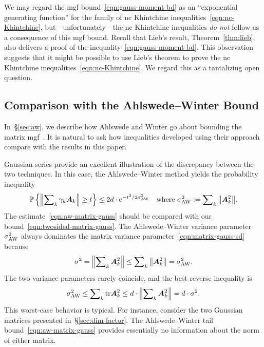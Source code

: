 \documentclass[11pt,letterpaper,twoside,reqno,draft]{amsart}
\theoremstyle{remark}
\numberwithin{equation}{section}
\numberwithin{thm}{section}
\begin{document}
We may regard the mgf bound~\eqref{eqn:gauss-moment-bd} as an ``exponential generating function'' for the family of nc Khintchine inequalities~\eqref{eqn:nc-Khintchine}, but---unfortunately---the nc Khintchine inequalities \emph{do not} follow as a consequence of this mgf bound. 
Recall that Lieb's result, Theorem~\ref{thm:lieb}, also delivers a proof of the inequality~\eqref{eqn:gauss-moment-bd}.  This observation suggests that it might be possible to use Lieb's theorem to prove the nc Khintchine inequalities~\eqref{eqn:nc-Khintchine}.  We regard this as a tantalizing open question.

 

\subsection{Comparison with the Ahlswede--Winter Bound} \label{sec:aw-gauss}

In~\S\ref{sec:aw}, we describe how Ahlswede and Winter go about bounding the matrix mgf~\cite[App.]{AW02:Strong-Converse}.  It is natural to ask how inequalities developed using their approach compare with the results in this paper.

Gaussian series provide an excellent illustration of the discrepancy between the two techniques.  In this case, the Ahlswede--Winter method yields the probability inequality
\begin{equation} \label{eqn:aw-matrix-gauss}
{\mathbb{P}\left\{ {{ {\left\Vert {{ \sum\nolimits_k \gamma_k {\bm{{A}}}_k }} \right\Vert} \geq t }} \right\}}
	\leq 2d \cdot {\mathrm{e}}^{- t^2 / 2\sigma_{\rm AW}^2 }
\quad\text{where $\sigma_{\rm AW}^2 := \sum\nolimits_k {\left\Vert {{{\bm{{A}}}_k^2}} \right\Vert}$.}
\end{equation}
The estimate~\eqref{eqn:aw-matrix-gauss} should be compared with our bound~\eqref{eqn:twosided-matrix-gauss}.
The Ahlswede--Winter variance parameter $\sigma_{\rm AW}^2$
always dominates the matrix variance parameter~\eqref{eqn:matrix-gauss-sd} because
$$
\sigma^2 = {\left\Vert {{ \sum\nolimits_k {\bm{{A}}}_k^2 }} \right\Vert}
	\leq \sum\nolimits_k {\left\Vert {{{\bm{{A}}}_k^2}} \right\Vert}
	= \sigma^2_{\rm AW}.
$$
The two variance parameters rarely coincide, and the best reverse inequality is
$$
\sigma_{\rm AW}^2 \leq \sum\nolimits_k {\operatorname{tr}} {\bm{{A}}}_k^2
	\leq d \cdot {\left\Vert {{ \sum\nolimits_k {\bm{{A}}}_k^2 }} \right\Vert}
	= d \cdot \sigma^2.
$$
This 
worst-case behavior is typical. For instance, consider the two Gaussian matrices presented in~\S\ref{sec:dim-factor}.  The Ahlswede--Winter tail bound~\eqref{eqn:aw-matrix-gauss} provides essentially no information about the norm of either matrix.
\end{document}

